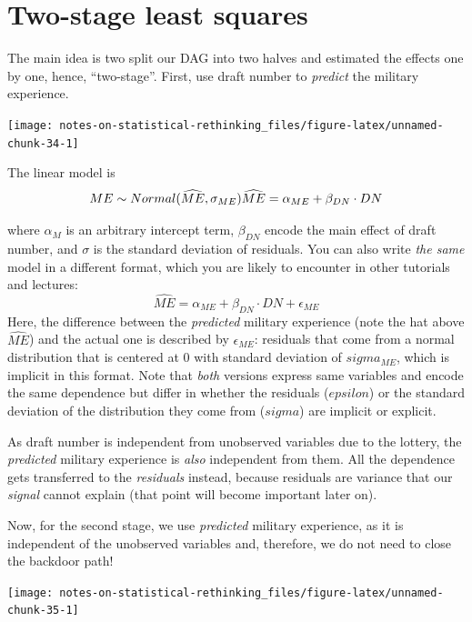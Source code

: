 \documentclass[
]{book}
\begin{document}
\hypertarget{two-stage-least-squares}{%
\section*{Two-stage least squares}\label{two-stage-least-squares}}

The main idea is two split our DAG into two halves and estimated the effects one by one, hence, ``two-stage''. First, use draft number to \emph{predict} the military experience.

\begin{center}\texttt{[image: notes-on-statistical-rethinking\_files/figure-latex/unnamed-chunk-34-1]} \end{center}

The linear model is
\[ME \sim Normal(\widehat{ME}, \sigma_{ME})\\
\widehat{ME} = \alpha_{ME} + \beta_{DN} \cdot DN\]

where \(\alpha_M\) is an arbitrary intercept term, \(\beta_{DN}\) encode the main effect of draft number, and \(\sigma\) is the standard deviation of residuals. You can also write \emph{the same} model in a different format, which you are likely to encounter in other tutorials and lectures:
\[\widehat{ME} = \alpha_{ME} + \beta_{DN} \cdot DN + \epsilon_{ME}\]
Here, the difference between the \emph{predicted} military experience (note the hat above \(\widehat{ME}\)) and the actual one is described by \(\epsilon_{ME}\): residuals that come from a normal distribution that is centered at 0 with standard deviation of \(sigma_{ME}\), which is implicit in this format. Note that \emph{both} versions express same variables and encode the same dependence but differ in whether the residuals (\(epsilon\)) or the standard deviation of the distribution they come from (\(sigma\)) are implicit or explicit.

As draft number is independent from unobserved variables due to the lottery, the \emph{predicted} military experience is \emph{also} independent from them. All the dependence gets transferred to the \emph{residuals} instead, because residuals are variance that our \emph{signal} cannot explain (that point will become important later on).

Now, for the second stage, we use \emph{predicted} military experience, as it is independent of the unobserved variables and, therefore, we do not need to close the backdoor path!

\begin{center}\texttt{[image: notes-on-statistical-rethinking\_files/figure-latex/unnamed-chunk-35-1]} \end{center}
\end{document}
